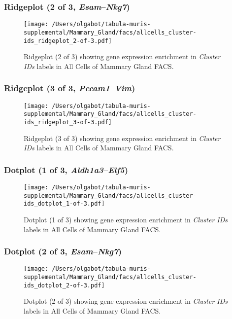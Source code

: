 \clearpage

\subsubsection{Ridgeplot (2 of 3, \emph{Esam}--\emph{Nkg7})}
\begin{figure}[h]
\centering
\texttt{[image: /Users/olgabot/tabula-muris-supplemental/Mammary\_Gland/facs/allcells\_cluster-ids\_ridgeplot\_2-of-3.pdf]}

\caption{ Ridgeplot (2 of 3)  showing gene expression enrichment in \emph{Cluster IDs} labels in All Cells of Mammary Gland FACS. }
\end{figure}


\clearpage

\subsubsection{Ridgeplot (3 of 3, \emph{Pecam1}--\emph{Vim})}
\begin{figure}[h]
\centering
\texttt{[image: /Users/olgabot/tabula-muris-supplemental/Mammary\_Gland/facs/allcells\_cluster-ids\_ridgeplot\_3-of-3.pdf]}

\caption{ Ridgeplot (3 of 3)  showing gene expression enrichment in \emph{Cluster IDs} labels in All Cells of Mammary Gland FACS. }
\end{figure}


\clearpage

\subsubsection{Dotplot (1 of 3, \emph{Aldh1a3}--\emph{Elf5})}
\begin{figure}[h]
\centering
\texttt{[image: /Users/olgabot/tabula-muris-supplemental/Mammary\_Gland/facs/allcells\_cluster-ids\_dotplot\_1-of-3.pdf]}

\caption{ Dotplot (1 of 3)  showing gene expression enrichment in \emph{Cluster IDs} labels in All Cells of Mammary Gland FACS. }
\end{figure}


\clearpage

\subsubsection{Dotplot (2 of 3, \emph{Esam}--\emph{Nkg7})}
\begin{figure}[h]
\centering
\texttt{[image: /Users/olgabot/tabula-muris-supplemental/Mammary\_Gland/facs/allcells\_cluster-ids\_dotplot\_2-of-3.pdf]}

\caption{ Dotplot (2 of 3)  showing gene expression enrichment in \emph{Cluster IDs} labels in All Cells of Mammary Gland FACS. }
\end{figure}


